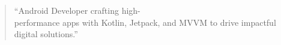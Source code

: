 \documentclass[10pt,a4paper,ragged2e,withhyper]{altacv}
\begin{document}
\begin{paracol}{2}








\switchcolumn




\begin{quote}
``Android Developer crafting high-\\performance apps with Kotlin, Jetpack, and MVVM to drive impactful digital solutions.''
\end{quote}



\divider





\end{paracol}
\end{document}
